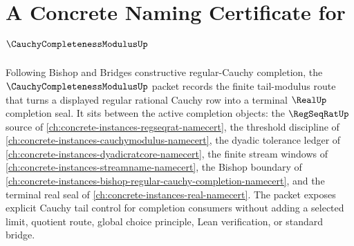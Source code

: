 \chapter{A Concrete Naming Certificate for $\CauchyCompletenessModulusUp$}
\label{ch:concrete-instances-cauchy-completeness-modulus-namecert}

Following Bishop and Bridges constructive regular-Cauchy completion, the $\CauchyCompletenessModulusUp$ packet records the finite tail-modulus route that turns a displayed regular rational Cauchy row into a terminal $\RealUp$ completion seal. It sits between the active completion objects: the $\RegSeqRatUp$ source of \autoref{ch:concrete-instances-regseqrat-namecert}, the threshold discipline of \autoref{ch:concrete-instances-cauchymodulus-namecert}, the dyadic tolerance ledger of \autoref{ch:concrete-instances-dyadicratcore-namecert}, the finite stream windows of \autoref{ch:concrete-instances-streamname-namecert}, the Bishop boundary of \autoref{ch:concrete-instances-bishop-regular-cauchy-completion-namecert}, and the terminal real seal of \autoref{ch:concrete-instances-real-namecert}. The packet exposes explicit Cauchy tail control for completion consumers without adding a selected limit, quotient route, global choice principle, Lean verification, or standard bridge.


